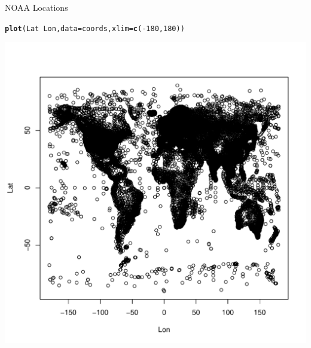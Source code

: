 \documentclass{article}\usepackage[]{graphicx}\usepackage[]{color}
\makeatletter
\def\maxwidth{ %
  \ifdim\Gin@nat@width>\linewidth
    \linewidth
  \else
    \Gin@nat@width
  \fi
}
\newcommand{\hlnum}[1]{\textcolor[rgb]{0.686,0.059,0.569}{#1}}%
\newcommand{\hlopt}[1]{\textcolor[rgb]{0,0,0}{#1}}%
\newcommand{\hlstd}[1]{\textcolor[rgb]{0.345,0.345,0.345}{#1}}%
\newcommand{\hlkwc}[1]{\textcolor[rgb]{0.333,0.667,0.333}{#1}}%
\newcommand{\hlkwd}[1]{\textcolor[rgb]{0.737,0.353,0.396}{\textbf{#1}}}%
\newenvironment{kframe}{%
 \def\at@end@of@kframe{}%
 \ifinner\ifhmode%
  \def\at@end@of@kframe{\end{minipage}}%
  \begin{minipage}{\columnwidth}%
 \fi\fi%
 \def\FrameCommand##1{\hskip\@totalleftmargin \hskip-\fboxsep
 \colorbox{shadecolor}{##1}\hskip-\fboxsep
     \hskip-\linewidth \hskip-\@totalleftmargin \hskip\columnwidth}%
 \MakeFramed {\advance\hsize-\width
   \@totalleftmargin\z@ \linewidth\hsize
   \@setminipage}}%
 {\par\unskip\endMakeFramed%
 \at@end@of@kframe}
\newenvironment{knitrout}{}{} %
\makeatother
\begin{document}
NOAA Locations
\begin{knitrout}
\color{fgcolor}\begin{kframe}
\begin{alltt}
\hlkwd{plot}\hlstd{(Lat} \hlopt{~} \hlstd{Lon,} \hlkwc{data}\hlstd{=coords,} \hlkwc{xlim}\hlstd{=}\hlkwd{c}\hlstd{(}\hlopt{-}\hlnum{180}\hlstd{,} \hlnum{180}\hlstd{) )}
\end{alltt}
\end{kframe}
\includegraphics[width=\maxwidth]{figure/NOAApoints-1} 

\end{knitrout}
\end{document}
